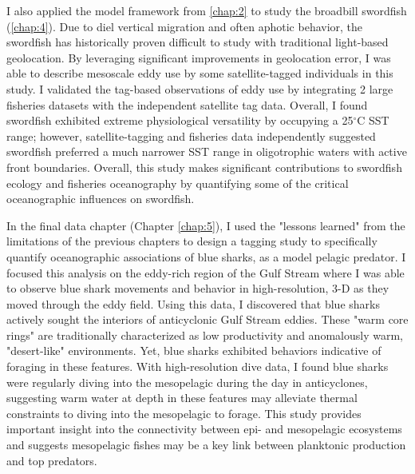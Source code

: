 I also applied the model framework from \cref{chap:2} to study the broadbill swordfish (\cref{chap:4}). Due to diel vertical migration and often aphotic behavior, the swordfish has historically proven difficult to study with traditional light-based geolocation. By leveraging significant improvements in geolocation error, I was able to describe mesoscale eddy use by some satellite-tagged individuals in this study. I validated the tag-based observations of eddy use by integrating 2 large fisheries datasets with the independent satellite tag data. Overall, I found swordfish exhibited extreme physiological versatility by occupying a 25$^\circ$C SST range; however, satellite-tagging and fisheries data independently suggested swordfish preferred a much narrower SST range in oligotrophic waters with active front boundaries. Overall, this study makes significant contributions to swordfish ecology and fisheries oceanography by quantifying some of the critical oceanographic influences on swordfish.

In the final data chapter (Chapter \ref{chap:5}), I used the "lessons learned" from the limitations of the previous chapters to design a tagging study to specifically quantify oceanographic associations of blue sharks, as a model pelagic predator. I focused this analysis on the eddy-rich region of the Gulf Stream where I was able to observe blue shark movements and behavior in high-resolution, 3-D as they moved through the eddy field. Using this data, I discovered that blue sharks actively sought the interiors of anticyclonic Gulf Stream eddies. These "warm core rings" are traditionally characterized as low productivity and anomalously warm, "desert-like" environments. Yet, blue sharks exhibited behaviors indicative of foraging in these features. With high-resolution dive data, I found blue sharks were regularly diving into the mesopelagic during the day in anticyclones, suggesting warm water at depth in these features may alleviate thermal constraints to diving into the mesopelagic to forage. This study provides important insight into the connectivity between epi- and mesopelagic ecosystems and suggests mesopelagic fishes may be a key link between planktonic production and top predators.


